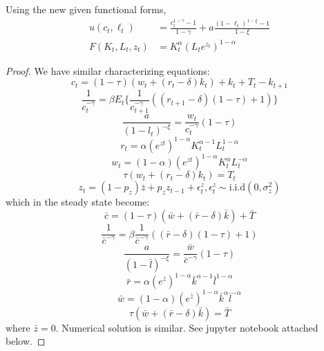 \documentclass[12pt]{article}
\newenvironment{problem}[2][Problem]{\begin{trivlist}
\item[\hskip \labelsep {\bfseries #1}\hskip \labelsep {\bfseries #2.}]}{\end{trivlist}}
\begin{document}
\begin{problem}{6}
Using the new given functional forms,
\begin{equation}
\begin{split}
u(c_t,\ell_t) & = \frac{c^{1-\gamma}_t -1}{1-\gamma}+ a \frac{(1-\ell_t)^{1-\xi}-1}{1-\xi}      \\
F(K_t,L_t,z_t) & = K^{\alpha}_t (L_te^{z_t})^{1-\alpha}  \nonumber
\end{split}
\end{equation}
\begin{proof}
We have similar characterizing equations:
$$c_t = (1-\tau)(w_t+ (r_t -\delta)k_t) + k_t + T_t - k_{t+1}$$
$$\frac{1}{c_t^{-\gamma}} = \beta E_t \big\{ \frac{1}{c_{t+1}^{-\gamma}}((r_{t+1} - \delta)(1-\tau)+ 1) \big\}$$
$$\frac{a}{(1-l_t)^{-\xi}} = \frac{w_t}{c_t^{-\gamma}}(1-\tau)$$
$$r_t = \alpha (e^{zt})^{1-\alpha} K_t^{\alpha-1} L_t^ {1-\alpha}$$
$$w_t = (1-\alpha) (e^{zt})^{1-\alpha} K_t^{\alpha}L_t^ {-\alpha} $$
$$\tau(w_t + (r_t -\delta)k_t) = T_t$$
$$z_t = (1-p_z)\bar{z} + p_zz_{t-1} + \epsilon^z_t,  \epsilon^z_t \sim \text{i.i.d}(0, \sigma^2_z)$$
which in the steady state become:
$$\bar{c} = (1-\tau)(\bar{w} + (\bar{r} -\delta)\bar{k}) + \bar{T}$$
$$\frac{1}{\bar{c}^{-\gamma}} = \beta \frac{1}{\bar{c}^{-\gamma}}((\bar{r} - \delta)(1-\tau)+ 1) $$
$$\frac{a}{(1-\bar{l})^{-\xi}} = \frac{\bar{w}}{\bar{c}^{-\gamma}}(1-\tau)$$
$$\bar{r} = \alpha (e^{\bar{z}})^{1-\alpha} \bar{k}^{\alpha-1} \bar{l}^{1-\alpha} $$
$$\bar{w} = (1-\alpha) (e^{\bar{z}})^{1-\alpha} \bar{k}^{\alpha} \bar{l}^{-\alpha}$$
$$\tau(\bar{w} + (\bar{r} -\delta)\bar{k}) =  \bar{T}$$
where $\bar{z} = 0$.
Numerical solution is similar. See jupyter notebook attached below.
\end{proof}
\end{problem}
\end{document}

